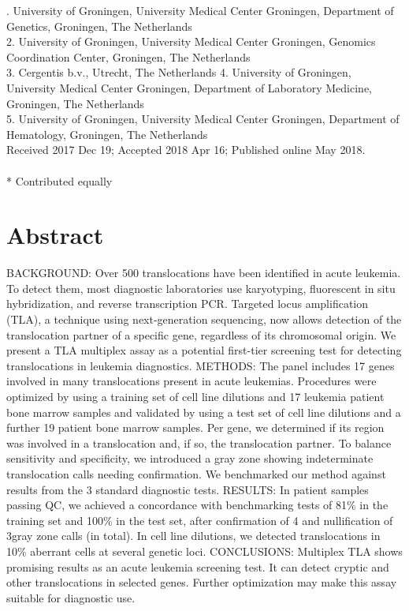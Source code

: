 . University of Groningen, University Medical Center Groningen, Department of Genetics, Groningen, The Netherlands\\
2. University of Groningen, University Medical Center Groningen, Genomics Coordination Center, Groningen, The Netherlands\\
3. Cergentis b.v., Utrecht, The Netherlands
4. University of Groningen, University Medical Center Groningen, Department of Laboratory Medicine, Groningen, The Netherlands\\
5. University of Groningen, University Medical Center Groningen, Department of Hematology, Groningen, The Netherlands\\

\noindent
Received 2017 Dec 19; Accepted 2018 Apr 16; Published online May 2018.
\\~\\
* Contributed equally


\section*{Abstract}\label{abstract}
BACKGROUND: Over 500 translocations have been identified in acute leukemia.
To detect them, most diagnostic laboratories use karyotyping, fluorescent in situ hybridization, and reverse transcription PCR. 
Targeted locus amplification (TLA), a technique using next-generation sequencing, now allows detection of the translocation partner of a specific gene, regardless of its chromosomal origin. 
We present a TLA multiplex assay as a potential first-tier screening test for detecting translocations in leukemia diagnostics.
METHODS: The panel includes 17 genes involved in many translocations present in acute leukemias. 
Procedures were optimized by using a training set of cell line dilutions and 17 leukemia patient bone marrow samples and validated by using a test set of cell line dilutions and a further 19 patient bone marrow samples.
Per gene, we determined if its region was involved in a translocation and, if so, the translocation partner. 
To balance sensitivity and specificity, we introduced a gray zone showing indeterminate translocation calls needing confirmation. 
We benchmarked our method against results from the 3 standard diagnostic tests.
RESULTS: In patient samples passing QC, we achieved a concordance with benchmarking tests of 81\% in the training set and 100\% in the test set, after confirmation of 4 and nullification of 3gray zone calls (in total).
In cell line dilutions, we detected translocations in 10\% aberrant cells at several genetic loci.
CONCLUSIONS: Multiplex TLA shows promising results as an acute leukemia screening test. 
It can detect cryptic and other translocations in selected genes. 
Further optimization may make this assay suitable for diagnostic use.  


